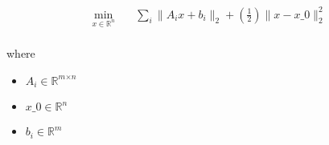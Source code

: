 \documentclass[12pt]{article}
\begin{document}
\[
\begin{aligned} \min_{\textit{x} \in \mathbb{R}^{ \textit{n}}} \quad & \sum_\textit{i} \|\textit{A}_{ \textit{i} }\textit{x} + \textit{b}_{ \textit{i} }\|_2 + (\frac{1}{2})\|\textit{x} - \textit{x\_0}\|_2^{2} \\
\end{aligned}
\]

where
\begin{itemize}
\item $\textit{A}_{\textit{i}} \in \mathbb{R}^{ \textit{m} \times \textit{n} }$
\item $\textit{x\_0} \in \mathbb{R}^{ \textit{n}}$
\item $\textit{b}_{\textit{i}} \in \mathbb{R}^{ \textit{m}}$
\end{itemize}
\end{document}
